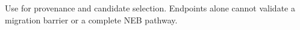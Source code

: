 Use for provenance and candidate selection. Endpoints alone cannot validate a migration barrier or a complete NEB pathway.
